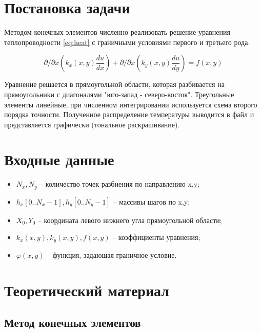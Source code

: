 \documentclass[a4paper, 12pt]{article}
\begin{document}


\section{Постановка задачи}

Методом конечных элементов численно реализовать решение уравнения
теплопроводности \ref{eq:heat} с граничными условиями первого и третьего рода.

\begin{equation}
\partial/\partial x \left(k_x(x,y) \frac{du}{dx} \right) +
\partial/\partial x \left(k_y(x,y) \frac{du}{dy}\right) = f(x,y)
\end{equation} \label{eq:heat}

Уравнение решается в прямоугольной области, которая разбивается на
прямоугольники с диагоналями "юго-запад - северо-восток". Треугольные элементы
линейные, при численном интегрировании используется схема второго порядка
точности. Полученное распределение температуры выводится в файл и представляется
графически (тональное раскрашивание).

\clearpage

\section{Входные данные}

\begin{itemize}
	\item $N_x, N_y$ --  количество точек разбиения по направлению x,y;
	\item $h_x[0 .. N_x-1], h_y[0 .. N_y-1]$ -- массивы шагов по x,y;
	\item $X_0, Y_0$ -- координата левого нижнего угла прямоугольной области;
	\item $k_x(x,y), k_y(x,y), f(x,y)$ -- коэффициенты уравнения;
	\item $\varphi(x,y)$ -- функция, задающая граничное условие.
\end{itemize}

\clearpage
\section{Теоретический материал}

\subsection{Метод конечных элементов}
\end{document}
